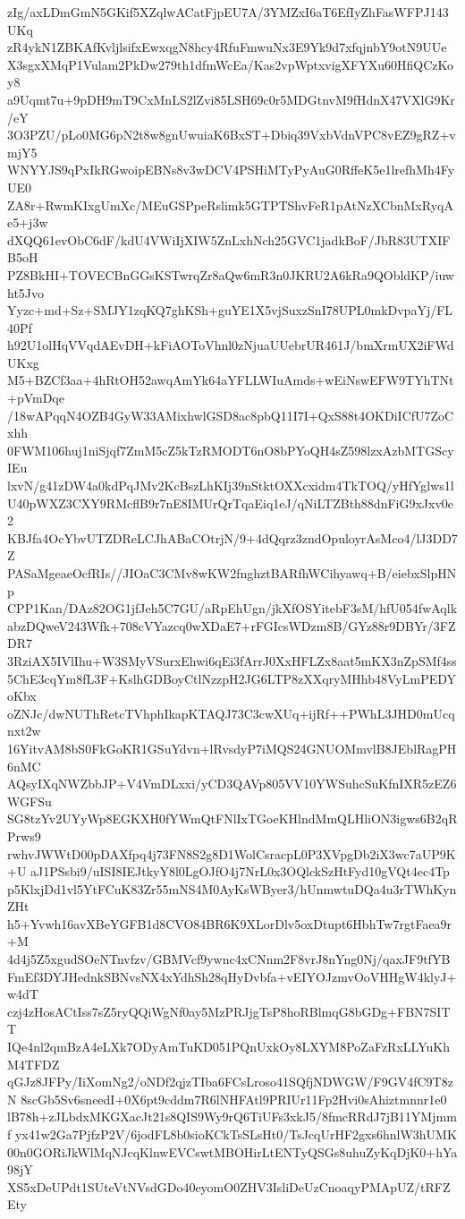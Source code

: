 zIg/axLDmGmN5GKif5XZqlwACatFjpEU7A/3YMZxI6aT6EfIyZhFasWFPJ143UKq
zR4ykN1ZBKAfKvljlsifxEwxqgN8hcy4RfuFmwuNx3E9Yk9d7xfqjnbY9otN9UUe
X3sgxXMqP1Vulam2PkDw279th1dfmWcEa/Kas2vpWptxvigXFYXu60HfiQCzKoy8
a9Uqmt7u+9pDH9mT9CxMnLS2lZvi85LSH69c0r5MDGtnvM9fHdnX47VXlG9Kr/eY
3O3PZU/pLo0MG6pN2t8w8gnUwuiaK6BxST+Dbiq39VxbVdnVPC8vEZ9gRZ+vmjY5
WNYYJS9qPxIkRGwoipEBNs8v3wDCV4PSHiMTyPyAuG0RffeK5e1lrefhMh4FyUE0
ZA8r+RwmKIxgUmXc/MEuGSPpeRslimk5GTPTShvFeR1pAtNzXCbnMxRyqAe5+j3w
dXQQ61evObC6dF/kdU4VWiIjXIW5ZnLxhNch25GVC1jadkBoF/JbR83UTXIFB5oH
PZ8BkHI+TOVECBnGGsKSTwrqZr8aQw6mR3n0JKRU2A6kRa9QObldKP/iuwht5Jvo
Yyzc+md+Sz+SMJY1zqKQ7ghKSh+guYE1X5vjSuxzSnI78UPL0mkDvpaYj/FL40Pf
h92U1olHqVVqdAEvDH+kFiAOToVhnl0zNjuaUUebrUR461J/bmXrmUX2iFWdUKxg
M5+BZCf3aa+4hRtOH52awqAmYk64aYFLLWIuAmds+wEiNswEFW9TYhTNt+pVmDqe
/18wAPqqN4OZB4GyW33AMixhwlGSD8ac8pbQ11I7I+QxS88t4OKDiICfU7ZoCxhh
0FWM106huj1niSjqf7ZmM5cZ5kTzRMODT6nO8bPYoQH4sZ598lzxAzbMTGScyIEu
lxvN/g41zDW4a0kdPqJMv2KcBszLhKIj39nStktOXXcxidm4TkTOQ/yHfYglws1l
U40pWXZ3CXY9RMcflB9r7nE8IMUrQrTqaEiq1eJ/qNiLTZBth88dnFiG9xJxv0e2
KBJfa4OcYbvUTZDReLCJhABaCOtrjN/9+4dQqrz3zndOpuloyrAsMco4/lJ3DD7Z
PASaMgeaeOcfRIs//JIOaC3CMv8wKW2fnghztBARfhWCihyawq+B/eiebxSlpHNp
CPP1Kan/DAz82OG1jfJeh5C7GU/aRpEhUgn/jkXfOSYitebF3sM/hfU054fwAqlk
abzDQweV243Wfk+708cVYazcq0wXDaE7+rFGIcsWDzm8B/GYz88r9DBYr/3FZDR7
3RziAX5IVlIhu+W3SMyVSurxEhwi6qEi3fArrJ0XxHFLZx8aat5mKX3nZpSMf4ss
5ChE3cqYm8fL3F+KslhGDBoyCtlNzzpH2JG6LTP8zXXqryMHhb48VyLmPEDYoKbx
oZNJc/dwNUThRetcTVhphIkapKTAQJ73C3cwXUq+ijRf++PWhL3JHD0mUcqnxt2w
16YitvAM8bS0FkGoKR1GSuYdvn+lRvsdyP7iMQS24GNUOMmvlB8JEblRagPH6nMC
AQsyIXqNWZbbJP+V4VmDLxxi/yCD3QAVp805VV10YWSuhcSuKfnIXR5zEZ6WGFSu
SG8tzYv2UYyWp8EGKXH0fYWmQtFNlIxTGoeKHlndMmQLHliON3igws6B2qRPrws9
rwhvJWWtD00pDAXfpq4j73FN8S2g8D1WolCsracpL0P3XVpgDb2iX3wc7aUP9K+U
aJ1PSsbi9/uISI8IEJtkyY8l0LgOJfO4j7NrL0x3OQlckSzHtFyd10gVQt4ec4Tp
p5KlxjDd1vl5YtFCuK83Zr55mNS4M0AyKsWByer3/hUnmwtuDQa4u3rTWhKynZHt
h5+Yvwh16avXBeYGFB1d8CVO84BR6K9XLorDlv5oxDtupt6HbhTw7rgtFaea9r+M
4d4j5Z5xgudSOeNTnvfzv/GBMVcf9ywnc4xCNnm2F8vrJ8nYng0Nj/qaxJF9tfYB
FmEf3DYJHednkSBNvsNX4xYdhSh28qHyDvbfa+vEIYOJzmvOoVHHgW4klyJ+w4dT
czj4zHosACtIss7sZ5ryQQiWgNf0ay5MzPRJjgTsP8hoRBlmqG8bGDg+FBN7SITT
IQe4nl2qmBzA4eLXk7ODyAmTuKD051PQnUxkOy8LXYM8PoZaFzRxLLYuKhM4TFDZ
qGJz8JFPy/IiXomNg2/oNDf2qjzTIba6FCsLroso41SQfjNDWGW/F9GV4fC9T8zN
8scGb5Sv6sneedI+0X6pt9cddm7R6lNHFAtl9PRIUr11Fp2Hvi0sAhiztmnnr1e0
lB78h+zJLbdxMKGXacJt21s8QIS9Wy9rQ6TiUFs3xkJ5/8fmcRRdJ7jB11YMjmmf
yx41w2Ga7PjfzP2V/6jodFL8b0sioKCkTsSLsHt0/TsJcqUrHF2gxs6hnlW3hUMK
00n0GORiJkWlMqNJcqKlnwEVCswtMBOHirLtENTyQSGs8uhuZyKqDjK0+hYa98jY
XS5xDeUPdt1SUteVtNVsdGDo40eyomO0ZHV3IsliDeUzCnoaqyPMApUZ/tRFZEty
